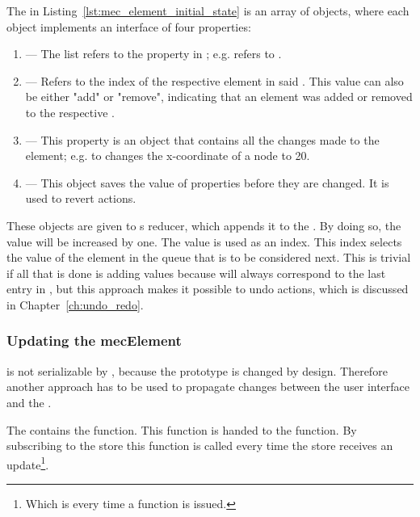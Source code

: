 The  in Listing~\ref{lst:mec_element_initial_state} is an array of objects, where each object implements an interface of four properties:

\begin{enumerate}
    \item {} --- The list refers to the property in ; e.g.  refers to .
    \item {} --- Refers to the index of the respective element in said . This value can also be either "add" or "remove", indicating that an element was added or removed to the respective .
    \item {} --- This property is an object that contains all the changes made to the element; e.g.  to changes the x-coordinate of a node to 20.
    \item {} --- This object saves the value of properties before they are changed. It is used to revert actions.
\end{enumerate}

These objects are given to s  reducer, which appends it to the .
By doing so, the  value will be increased by one.
The  value is used as an index.
This index selects the value of the element in the queue that is to be considered next.
This is trivial if all that is done is adding values because  will always correspond to the last entry in , but this approach makes it possible to undo actions, which is discussed in Chapter~\ref{ch:undo_redo}.

\subsubsection{Updating the mecElement}\label{ch:updating_the_mecelement}

 is not serializable by , because the prototype is changed by design.
Therefore another approach has to be used to propagate changes between the user interface and the .

The  contains the  function.
This function is handed to the  function.
By subscribing to the store this function is called every time the store receives an update\footnote{Which is every time a  function is issued.}.

